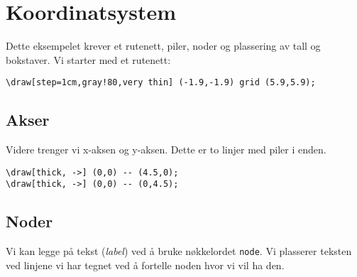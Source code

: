 \documentclass[11pt, a4paper]{article}
\begin{document}
\newpage

\section{Koordinatsystem}
Dette eksempelet krever et rutenett, piler, noder og plassering av tall og bokstaver. Vi starter med et rutenett:

\begin{center}
\scalebox{0.8}{
\begin{tikzpicture}
    \draw[step=1cm,gray!80,very thin] (-1.9,-1.9) grid (5.9,5.9);
\end{tikzpicture}
}
\end{center}

\begin{Verbatim}[fontsize=\small]
\draw[step=1cm,gray!80,very thin] (-1.9,-1.9) grid (5.9,5.9);
\end{Verbatim}

\subsection{Akser}
\noindent Videre trenger vi x-aksen og y-aksen. Dette er to linjer med piler i enden.

\begin{center}
\scalebox{0.8}{
\begin{tikzpicture}
    \draw[step=1cm,gray!80,very thin] (-1.9,-1.9) grid (5.9,5.9);
    \draw[thick, ->] (0,0) -- (4.5,0);
    \draw[thick, ->] (0,0) -- (0,4.5);
\end{tikzpicture}
}
\end{center}

\begin{Verbatim}[fontsize=\small]
\draw[thick, ->] (0,0) -- (4.5,0);
\draw[thick, ->] (0,0) -- (0,4.5);
\end{Verbatim}

\newpage

\subsection{Noder}
Vi kan legge på tekst (\textit{label}) ved å bruke nøkkelordet \texttt{node}. Vi plasserer teksten ved linjene vi har tegnet ved å fortelle noden hvor vi vil ha den.

\begin{center}
\end{center}
\end{document}
